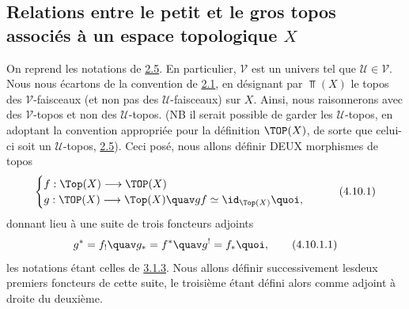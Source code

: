 \documentclass[10pt]{../fichiers-configuration-latex/smfart}
\begin{document}
\subsection{Relations entre le petit et le gros topos associés à
un espace topologique $X$}

On reprend les notations de \hyperref[IV.subsec2.5]{2.5}. En particulier,
$𝒱$ est un univers tel que $𝒰\in 𝒱$. Nous
nous écartons de la convention de \hyperref[IV.subsec2.1]{2.1}, en
désignant par $\Top(X)$ le topos des $𝒱$-faisceaux (et non
pas des $𝒰$-faisceaux) sur $X$. Ainsi, nous raisonnerons
avec des $𝒱$-topos et non des $𝒰$-topos. (NB il
serait possible de garder les $𝒰$-topos, en adoptant la
convention appropriée pour la définition $\TOP(X)$, de sorte que
celui-ci soit un $𝒰$-topos, \cf \hyperref[IV.subsec2.5]{2.5}). Ceci
posé, nous allons définir DEUX morphismes de topos
\begin{equation*}
\begin{cases}
 f: \Top(X)\longrightarrow \TOP(X)\\
 g: \TOP(X)\longrightarrow \Top(X)\quav gf\simeq \id_{\Top(X)}{\quoi},
\end{cases}\tag{4.10.1}
\end{equation*}
donnant lieu à une suite de trois foncteurs adjoints
\begin{equation*}
g^{\ast}=f_{!}\quav g_{\ast}=f^{\ast}\quav
g^{!}=f_{\ast}{\quoi},\tag{4.10.1.1}
\end{equation*}
les notations étant celles de \hyperref[IV.subsubsec3.1.3]{3.1.3}. Nous allons
définir successivement les\pageoriginale deux premiers foncteurs
de cette suite, le troisième étant défini alors comme adjoint
à droite du deuxième.

\setcounter{subsubsection}{1}
\end{document}
